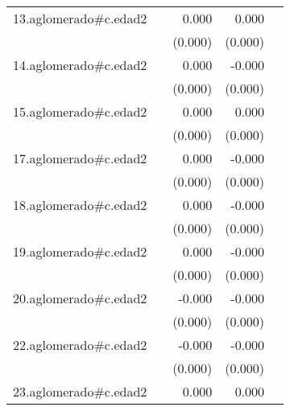 {\begin{longtable}{l*{4}{D{.}{.}{-1}}}
\addlinespace
13.aglomerado#c.edad2&                     &       0.000\sym{**} &       0.000         &                     \\
            &                     &     (0.000)         &     (0.000)         &                     \\
\addlinespace
14.aglomerado#c.edad2&                     &       0.000         &      -0.000\sym{*}  &                     \\
            &                     &     (0.000)         &     (0.000)         &                     \\
\addlinespace
15.aglomerado#c.edad2&                     &       0.000         &       0.000         &                     \\
            &                     &     (0.000)         &     (0.000)         &                     \\
\addlinespace
17.aglomerado#c.edad2&                     &       0.000         &      -0.000\sym{**} &                     \\
            &                     &     (0.000)         &     (0.000)         &                     \\
\addlinespace
18.aglomerado#c.edad2&                     &       0.000         &      -0.000         &                     \\
            &                     &     (0.000)         &     (0.000)         &                     \\
\addlinespace
19.aglomerado#c.edad2&                     &       0.000         &      -0.000         &                     \\
            &                     &     (0.000)         &     (0.000)         &                     \\
\addlinespace
20.aglomerado#c.edad2&                     &      -0.000         &      -0.000\sym{**} &                     \\
            &                     &     (0.000)         &     (0.000)         &                     \\
\addlinespace
22.aglomerado#c.edad2&                     &      -0.000         &      -0.000\sym{*}  &                     \\
            &                     &     (0.000)         &     (0.000)         &                     \\
\addlinespace
23.aglomerado#c.edad2&                     &       0.000\sym{*}  &       0.000         &                     \\

\end{longtable}}
